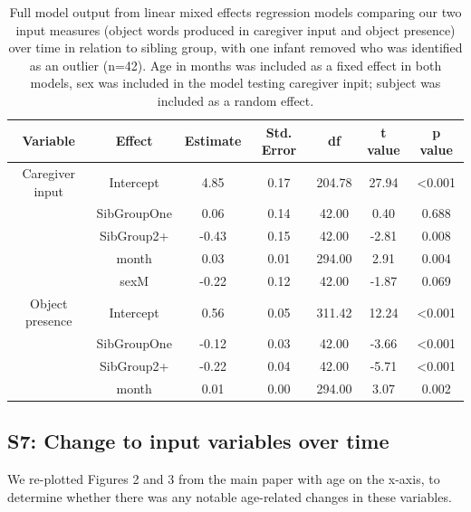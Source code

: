 \documentclass[
  man,mask,floatsintext]{apa6}
\begin{document}
\begin{longtable}[t]{ccccccc}
\caption{\label{tab:table-input-model-summary-red}Full model output from linear mixed effects regression models comparing our two input measures (object words produced in caregiver input and object presence) over time in relation to sibling group, with one infant removed who was identified as an outlier (n=42). Age in months was included as a fixed effect in both models, sex was included in the model testing caregiver inpit; subject was included as a random effect.}\\
\toprule
Variable & Effect & Estimate & Std. Error & df & t value & p value\\
\midrule
Caregiver input & Intercept & 4.85 & 0.17 & 204.78 & 27.94 & <0.001\\
 & SibGroupOne & 0.06 & 0.14 & 42.00 & 0.40 & 0.688\\
 & SibGroup2+ & -0.43 & 0.15 & 42.00 & -2.81 & 0.008\\
 & month & 0.03 & 0.01 & 294.00 & 2.91 & 0.004\\
 & sexM & -0.22 & 0.12 & 42.00 & -1.87 & 0.069\\
\midrule
\addlinespace
Object presence & Intercept & 0.56 & 0.05 & 311.42 & 12.24 & <0.001\\
 & SibGroupOne & -0.12 & 0.03 & 42.00 & -3.66 & <0.001\\
 & SibGroup2+ & -0.22 & 0.04 & 42.00 & -5.71 & <0.001\\
 & month & 0.01 & 0.00 & 294.00 & 3.07 & 0.002\\
\bottomrule
\end{longtable}
\newpage

\hypertarget{s7-change-to-input-variables-over-time}{%
\subsection{S7: Change to input variables over time}\label{s7-change-to-input-variables-over-time}}

We re-plotted Figures 2 and 3 from the main paper with age on the x-axis, to determine whether there was any notable age-related changes in these variables.
\end{document}
